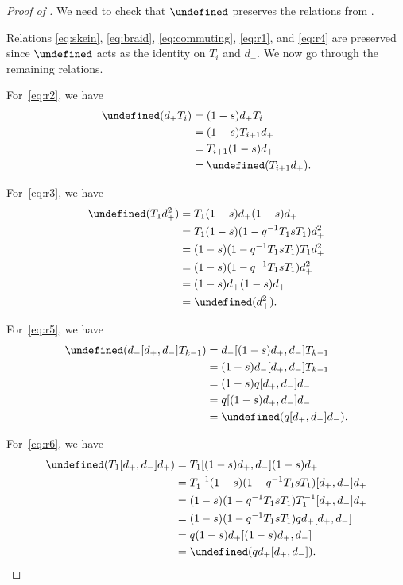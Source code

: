 \documentclass[reqno]{amsart}
\theoremstyle{plain}
\theoremstyle{definition}
\theoremstyle{remark}
\let\oldTheta\Theta
\let\Theta\undefined
\DeclareMathOperator{\Theta}{\oldTheta}
\newcommand{\<}{\langle}
\renewcommand{\>}{\rangle}
\begin{document}
\begin{proof}[Proof of {}]
    We need to check that $\Theta$ preserves the relations from .
    
    Relations \eqref{eq:skein}, \eqref{eq:braid}, \eqref{eq:commuting}, \eqref{eq:r1}, and \eqref{eq:r4} are preserved since $\Theta$ acts as the identity on $T_i$ and $d_-$. We now go through the remaining relations.

    For~\eqref{eq:r2}, we have
    \begin{align*}
        \Theta(d_+ T_i) & = (1-s) d_+ T_i \\
        & = (1-s) T_{i+1} d_+  \\
        & = T_{i+1} (1-s) d_+ \\
        & = \Theta(T_{i+1} d_+).
    \end{align*}

    For~\eqref{eq:r3}, we have
    \begin{align*}
        \Theta(T_1 d_+^2) & = T_1(1-s) d_+ (1-s) d_+ \\
        & = T_1 (1-s)(1-q^{-1}T_1sT_1) d_+^2 \\
        & = (1-s)(1 - q^{-1} T_1 s T_1) T_1 d_+^2 \\
        & = (1-s)(1 - q^{-1} T_1 s T_1) d_+^2 \\
        & = (1-s) d_+ (1-s) d_+ \\
        & = \Theta(d_+^2).
    \end{align*}

    For~\eqref{eq:r5}, we have
    \begin{align*}
        \Theta(d_- [d_+, d_-] T_{k-1}) & = d_- [(1-s) d_+, d_-] T_{k-1} \\
        & = (1-s) d_- [d_+, d_-] T_{k-1} \\
        & = (1-s) q [d_+, d_-] d_- \\
        & = q [(1-s) d_+, d_-] d_- \\
        & = \Theta(q [d_+, d_-] d_-).
    \end{align*}

    For~\eqref{eq:r6}, we have
    \begin{align*}
        \Theta(T_1 [d_+, d_-] d_+) & = T_1 [(1-s) d_+, d_-] (1-s) d_+ \\
        & = T_1^{-1}(1-s)(1 - q^{-1} T_1 s T_1) [d_+,d_-] d_+ \\
        & = (1-s)(1 - q^{-1} T_1 s T_1) T_1^{-1} [d_+,d_-] d_+ \\
        & = (1-s)(1 - q^{-1} T_1 s T_1) q d_+[d_+,d_-] \\
        & = q (1-s) d_+ [(1-s) d_+, d_-] \\
        & = \Theta(q d_+ [d_+, d_-]).
    \end{align*}


\end{proof}
\end{document}
